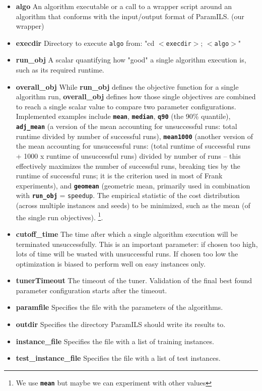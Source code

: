 \begin{itemize}
	\item {\bf algo} An algorithm executable or a call to a wrapper script around an algorithm that conforms with the input/output format of ParamILS. (our wrapper)
	\item {\bf execdir} Directory to execute \texttt{algo} from: "cd $<$\texttt{execdir}$>$; $<$\texttt{algo}$>$" 
	\item {\bf run\_obj} A scalar quantifying how "good" a single algorithm execution is, such as its required runtime.
	\item {\bf overall\_obj} While {\bf run\_obj} defines the objective function for a single algorithm run, {\bf overall\_obj} defines how those single objectives are combined to reach a single scalar value to compare two parameter configurations. Implemented examples include \texttt{\bf mean}, \texttt{\bf median}, \texttt{\bf q90} (the 90\% quantile), \texttt{\bf adj\_mean} (a version of the mean accounting for unsuccessful runs: total runtime divided by number of successful runs), \texttt{\bf mean1000} (another version of the mean accounting for unsuccessful runs: (total runtime of successful runs + 1000 x runtime of unsuccessful runs) divided by number of runs -- this effectively maximizes the number of successful runs, breaking ties by the runtime of successful runs; it is the criterion used in most of Frank experiments), and \texttt{\bf geomean} (geometric mean, primarily used in combination with \texttt{\bf run\_obj} = \texttt{speedup}. The empirical statistic of the cost distribution (across multiple instances and seeds) to be minimized, such as the mean (of the single run objectives). \footnote{We use  \texttt{\bf mean} but maybe we can experiment with other values}.
	\item {\bf cutoff\_time} The time after which a single algorithm execution will be terminated unsuccessfully. This is an important parameter: if chosen too high, lots of time will be wasted with unsuccessful runs. If chosen too low the optimization is biased to perform well on easy instances only.
	\item {\bf tunerTimeout} The timeout of the tuner. Validation of the final best found parameter configuration starts after the timeout.
	\item {\bf paramfile} Specifies the file with the parameters of the algorithms. 
	\item {\bf outdir} Specifies the directory ParamILS should write its results to.
	\item {\bf instance\_file} Specifies the file with a list of training instances. 
	\item {\bf test\_instance\_file} Specifies the file with a list of test instances.
\end{itemize}

